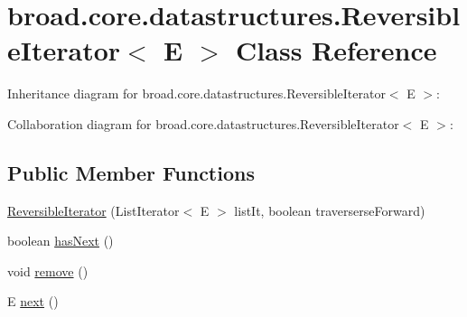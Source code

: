 \hypertarget{classbroad_1_1core_1_1datastructures_1_1_reversible_iterator_3_01_e_01_4}{\section{broad.\+core.\+datastructures.\+Reversible\+Iterator$<$ E $>$ Class Reference}
\label{classbroad_1_1core_1_1datastructures_1_1_reversible_iterator_3_01_e_01_4}
}


Inheritance diagram for broad.\+core.\+datastructures.\+Reversible\+Iterator$<$ E $>$\+:


Collaboration diagram for broad.\+core.\+datastructures.\+Reversible\+Iterator$<$ E $>$\+:
\subsection*{Public Member Functions}
\begin{DoxyCompactItemize}
\item 
\hyperlink{classbroad_1_1core_1_1datastructures_1_1_reversible_iterator_3_01_e_01_4_a772da3beff2f1a5c318368df7b443915}{Reversible\+Iterator} (List\+Iterator$<$ E $>$ list\+It, boolean traverserse\+Forward)
\item 
boolean \hyperlink{classbroad_1_1core_1_1datastructures_1_1_reversible_iterator_3_01_e_01_4_a9c549b83e34ba127d0df61d161380ade}{has\+Next} ()
\item 
void \hyperlink{classbroad_1_1core_1_1datastructures_1_1_reversible_iterator_3_01_e_01_4_aae39ce4d557d6d4b16a9572b4cf35266}{remove} ()
\item 
E \hyperlink{classbroad_1_1core_1_1datastructures_1_1_reversible_iterator_3_01_e_01_4_aa6d9d9246884ed677f156c11202cd4ed}{next} ()
\end{DoxyCompactItemize}


